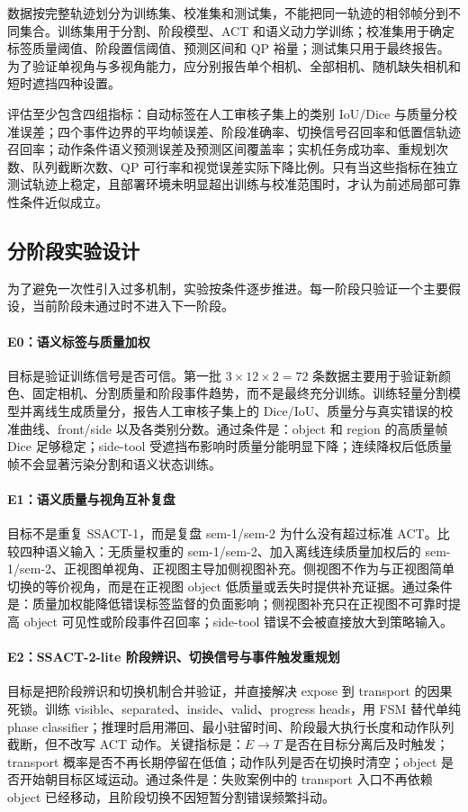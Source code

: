 \documentclass[UTF8,a4paper,11pt]{ctexart}
\begin{document}
数据按完整轨迹划分为训练集、校准集和测试集，不能把同一轨迹的相邻帧分到不同集合。训练集用于分割、阶段模型、ACT 和语义动力学训练；校准集用于确定标签质量阈值、阶段置信阈值、预测区间和 QP 裕量；测试集只用于最终报告。为了验证单视角与多视角能力，应分别报告单个相机、全部相机、随机缺失相机和短时遮挡四种设置。

评估至少包含四组指标：自动标签在人工审核子集上的类别 IoU/Dice 与质量分校准误差；四个事件边界的平均帧误差、阶段准确率、切换信号召回率和低置信轨迹召回率；动作条件语义预测误差及预测区间覆盖率；实机任务成功率、重规划次数、队列截断次数、QP 可行率和视觉误差实际下降比例。只有当这些指标在独立测试轨迹上稳定，且部署环境未明显超出训练与校准范围时，才认为前述局部可靠性条件近似成立。

\subsection{分阶段实验设计}

为了避免一次性引入过多机制，实验按条件逐步推进。每一阶段只验证一个主要假设，当前阶段未通过时不进入下一阶段。

\paragraph{E0：语义标签与质量加权}
目标是验证训练信号是否可信。第一批 $3\times12\times2=72$ 条数据主要用于验证新颜色、固定相机、分割质量和阶段事件趋势，而不是最终充分训练。训练轻量分割模型并离线生成质量分，报告人工审核子集上的 Dice/IoU、质量分与真实错误的校准曲线、front/side 以及各类别分数。通过条件是：object 和 region 的高质量帧 Dice 足够稳定；side-tool 受遮挡布影响时质量分能明显下降；连续降权后低质量帧不会显著污染分割和语义状态训练。

\paragraph{E1：语义质量与视角互补复盘}
目标不是重复 SSACT-1，而是复盘 sem-1/sem-2 为什么没有超过标准 ACT。比较四种语义输入：无质量权重的 sem-1/sem-2、加入离线连续质量加权后的 sem-1/sem-2、正视图单视角、正视图主导加侧视图补充。侧视图不作为与正视图简单切换的等价视角，而是在正视图 object 低质量或丢失时提供补充证据。通过条件是：质量加权能降低错误标签监督的负面影响；侧视图补充只在正视图不可靠时提高 object 可见性或阶段事件召回率；side-tool 错误不会被直接放大到策略输入。

\paragraph{E2：SSACT-2-lite 阶段辨识、切换信号与事件触发重规划}
目标是把阶段辨识和切换机制合并验证，并直接解决 expose 到 transport 的因果死锁。训练 visible、separated、inside、valid、progress heads，用 FSM 替代单纯 phase classifier；推理时启用滞回、最小驻留时间、阶段最大执行长度和动作队列截断，但不改写 ACT 动作。关键指标是：$E\rightarrow T$ 是否在目标分离后及时触发；transport 概率是否不再长期停留在低值；动作队列是否在切换时清空；object 是否开始朝目标区域运动。通过条件是：失败案例中的 transport 入口不再依赖 object 已经移动，且阶段切换不因短暂分割错误频繁抖动。
\end{document}
